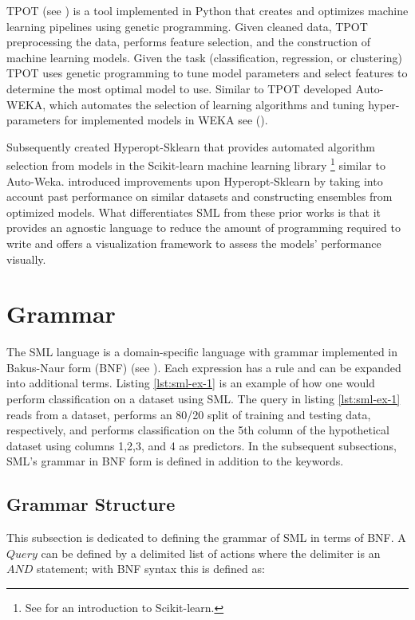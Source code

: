 TPOT (see \cite{TPOT}) is a tool implemented in Python that creates and optimizes machine learning pipelines using genetic programming.  Given cleaned data,  TPOT  preprocessing the data,  performs feature selection,  and the construction of machine learning models.  Given the task (classification,  regression,  or clustering) TPOT uses genetic programming to tune model parameters and select features to determine the most optimal model to use.  Similar to TPOT \cite{kotthoff_auto_2019} developed Auto-WEKA, which automates the selection of learning algorithms and tuning hyper-parameters for implemented models in WEKA see (\cite{frank2005weka}).   

Subsequently \cite{komer_hyperopt_2019} created Hyperopt-Sklearn that provides automated algorithm selection from models in the Scikit-learn machine learning library \footnote{See \cite{scikit-learn} for an introduction to Scikit-learn.} similar to Auto-Weka.  \cite{feurer_auto_2018} introduced improvements upon Hyperopt-Sklearn by taking into account past performance on similar datasets and constructing ensembles from optimized models.  What differentiates SML from these prior works is that it provides an agnostic language to reduce the amount of programming required to write and offers a visualization framework to assess the models' performance visually.

\section{Grammar}
\label{grammar}

The SML language is a domain-specific language with grammar implemented in Bakus-Naur form (BNF) (see \cite{Backus59}).  Each expression has a rule and can be expanded into additional terms.  Listing \ref{lst:sml-ex-1} is an example of how one would perform classification on a dataset using SML. The query in listing \ref{lst:sml-ex-1} reads from a dataset, performs an 80/20 split of training and testing data, respectively, and performs classification on the 5th column of the hypothetical dataset using columns 1,2,3, and 4 as predictors. In the subsequent subsections, SML's grammar in BNF form is defined in addition to the keywords.

\subsection{Grammar Structure}
This subsection is dedicated to defining the grammar of SML in terms of BNF.  A \(Query\) can be defined by a delimited list of actions where the delimiter is an \(AND\) statement; with BNF syntax this is defined as:

